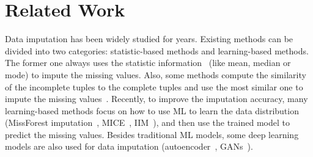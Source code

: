 \section{Related Work}\label{sec:related}

Data imputation has been widely studied for  years. Existing  methods can be divided into two categories: statistic-based methods and learning-based methods. The former one always uses the statistic information~\cite{DBLP:journals/tsmc/FarhangfarKP07, DBLP:conf/sigmod/MayfieldNP10} (like mean, median or mode) to impute the missing values. Also, some methods compute the similarity of the incomplete tuples to the complete tuples and use the most similar one to impute the missing values~\cite{altman1992introduction, DBLP:journals/artmed/JerezMGARMF10, DBLP:conf/isese/TwalaCS05}. Recently, to improve the imputation accuracy,   many learning-based methods focus on how to use ML to learn the data distribution (\eg MissForest imputation~\cite{DBLP:journals/bioinformatics/StekhovenB12}, MICE~\cite{royston2011multiple},  IIM~\cite{DBLP:conf/icde/ZhangSSW19}), and then  use the trained model to predict the missing values. Besides traditional ML models, some deep learning models are also used for data imputation (\eg  autoencoder~\cite{DBLP:journals/corr/GondaraW17, mccoy2018variational, DBLP:journals/pr/NazabalOGV20}, GANs~\cite{DBLP:journals/nn/SpinelliSU20, DBLP:conf/icml/YoonJS18}).
 
